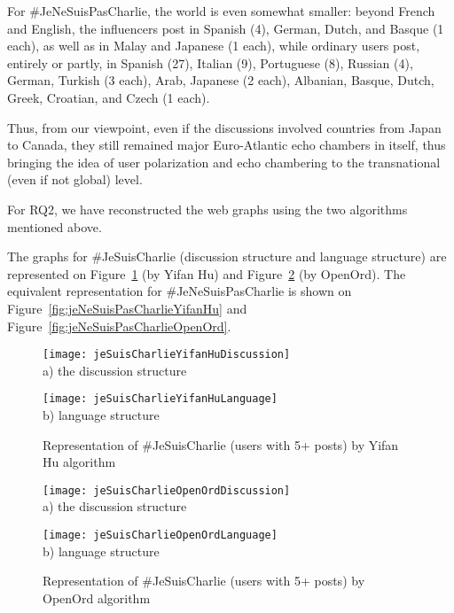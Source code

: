For \#JeNeSuisPasCharlie, the world is even somewhat smaller: beyond French and English, the influencers post in Spanish (4), German, Dutch, and Basque (1 each), as well as in Malay and Japanese (1 each), while ordinary users post, entirely or partly, in Spanish (27), Italian (9), Portuguese (8), Russian (4), German, Turkish (3 each), Arab, Japanese (2 each), Albanian, Basque, Dutch, Greek, Croatian, and Czech (1 each).

Thus, from our viewpoint, even if the discussions involved countries from Japan to Canada, they still remained major Euro-Atlantic echo chambers in itself, thus bringing the idea of user polarization and echo chambering to the transnational (even if not global) level.

For RQ2, we have reconstructed the web graphs using the two algorithms mentioned above.

The graphs for \#JeSuisCharlie (discussion structure and language structure) are represented on Figure~\cref{fig:jeSuisCharlieYifanHu} (by Yifan Hu) and Figure~\cref{fig:jeSuisCharlieOpenOrd} (by OpenOrd). The equivalent representation for \#JeNeSuisPasCharlie is shown on Figure~\cref{fig:jeNeSuisPasCharlieYifanHu} and Figure~\cref{fig:jeNeSuisPasCharlieOpenOrd}.

\begin{figure}[ht]
	\begin{minipage}[b][][b]{0.49\linewidth}\centering
		\texttt{[image: jeSuisCharlieYifanHuDiscussion]} \\ a) the discussion structure
	\end{minipage}
	\hfill
	\begin{minipage}[b][][b]{0.49\linewidth}\centering
		\texttt{[image: jeSuisCharlieYifanHuLanguage]} \\ b) language structure
	\end{minipage}
	\caption{Representation of \#JeSuisCharlie (users with 5+ posts) by Yifan Hu algorithm}
	\label{fig:jeSuisCharlieYifanHu}
\end{figure}

\begin{figure}[ht]
	\begin{minipage}[b][][b]{0.49\linewidth}\centering
		\texttt{[image: jeSuisCharlieOpenOrdDiscussion]} \\ a) the discussion structure
	\end{minipage}
	\hfill
	\begin{minipage}[b][][b]{0.49\linewidth}\centering
		\texttt{[image: jeSuisCharlieOpenOrdLanguage]} \\ b) language structure
	\end{minipage}
	\caption{Representation of \#JeSuisCharlie (users with 5+ posts) by OpenOrd algorithm}
	\label{fig:jeSuisCharlieOpenOrd}
\end{figure}

